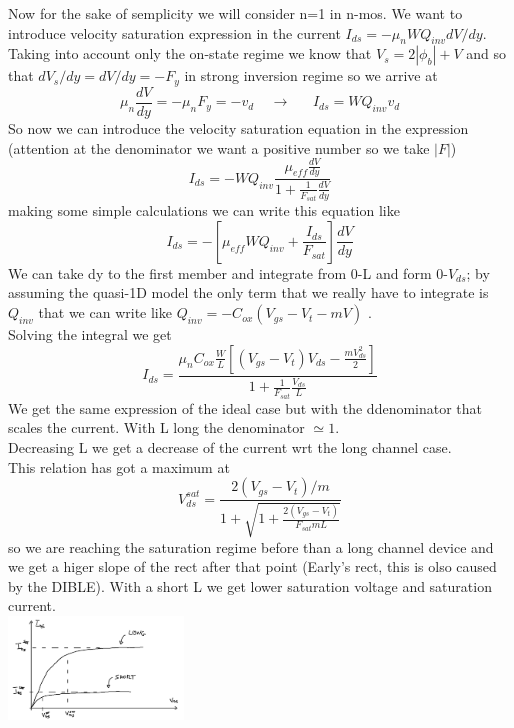 Now for the sake of semplicity we will consider n=1 in n-mos. We want to introduce velocity saturation expression in the current $I_{ds}=-\mu_nWQ_{inv}dV/dy$. Taking into account only the on-state regime we know that $V_s=2|\phi_b|+V$ and so that $dV_s/dy=dV/dy=-F_{y}$ in strong inversion regime so we arrive at 
\begin{equation}
\mu_n \frac{dV}{dy}=-\mu_nF_y=-v_d \ \ \ \ \ \rightarrow  \ \ \ \ \ \ \ I_{ds}=WQ_{inv}v_d
\end{equation}
So now we can introduce the velocity saturation equation in the expression (attention at the denominator we want a positive number so we take $|F|$)
\begin{equation}
I_{ds}=-WQ_{inv}\frac{\mu_{eff}\frac{dV}{dy}}{1+\frac{1}{F_{sat}}\frac{dV}{dy}}
\end{equation}
making some simple calculations we can write this equation like
\begin{equation}
I_{ds}=-[\mu_{eff}WQ_{inv}+\frac{I_{ds}}{F_{sat}}]\frac{dV}{dy}
\end{equation}
We can take dy to the first member and integrate from 0-L and form 0-$V_{ds}$; by assuming the quasi-1D model the only term that we really have to integrate is $Q_{inv}$ that we can write like $Q_{inv}=-C_{ox}(V_{gs}-V_t-mV)$ .\\
Solving the integral we get
\begin{equation}
I_{ds}=\frac{\mu_nC_{ox}\frac{W}{L}[(V_{gs}-V_t)V_{ds}-\frac{mV_{ds}^2}{2}]}{1+\frac{1}{F_{sat}}\frac{V_{ds}}{L}}
\end{equation}
We get the same expression of the ideal case but with the ddenominator that scales the current. With L long the denominator $\simeq 1$.\\
Decreasing L we get a decrease of the current wrt the long channel case.\\
This relation has got a maximum at 
\begin{equation}
V_{ds}^{sat}=\frac{2(V_{gs}-V_t)/m}{1+\sqrt{1+\frac{2(V_{gs}-V_t)}{F_{sat}mL}}}
\end{equation}
so we are reaching the saturation regime before than a long channel device and we get a higer slope of the rect after that point (Early's rect, this is olso caused by the DIBLE). With a short L we get lower saturation voltage and saturation current.\\

\centering
\includegraphics[width=0.35\textwidth]{ls.png}\\ %
\raggedright

